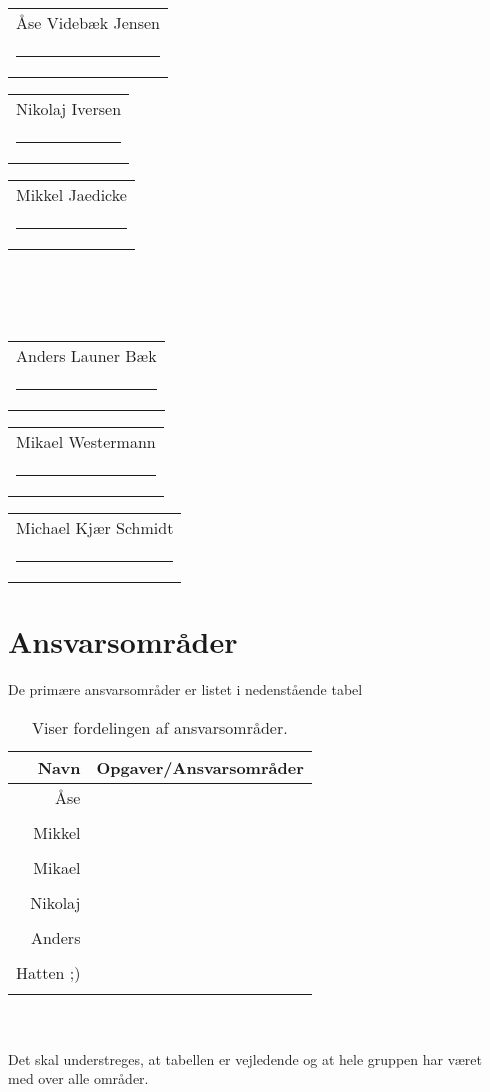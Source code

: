 




\vspace{3cm}
{
\newcommand{\namesigdate}[2][5cm]{%
  \begin{tabular}{@{}p{#1}@{}}
    #2 \\[2\normalbaselineskip] \hrule \\[0pt]
  \end{tabular}
}
\begin{changemargin}{-1cm}{-1cm}
\centering
\noindent \namesigdate{Åse Videbæk Jensen} \hspace{1cm} \namesigdate{Nikolaj Iversen} \hspace{1cm} \namesigdate{Mikkel Jaedicke} \\~\\~\\
\centering
\noindent \namesigdate{Anders Launer Bæk} \hspace{1cm}  \namesigdate{Mikael Westermann} \hspace{1cm}   \namesigdate{Michael Kjær Schmidt}
\end{changemargin}
}
\bigskip
\section*{Ansvarsområder}
De primære ansvarsområder er listet i nedenstående tabel
\bigskip
\begin{table}[!th]
\centering
\setlength{\extrarowheight}{5pt}
 \begin{tabular}{r|l}
Navn&Opgaver/Ansvarsområder \\[6pt] \hline
Åse&\\
&\\[6pt] \hline
Mikkel&\\ 
&\\[6pt] \hline
Mikael&\\
&\\[6pt] \hline
Nikolaj&\\
&\\[6pt] \hline
Anders&\\
&\\[6pt] \hline
Hatten ;) &\\
&\\
\end{tabular}     
\caption*{Viser fordelingen af ansvarsområder.}            
\end{table}\\~\\ 
Det skal understreges, at tabellen er vejledende og at hele gruppen har været med over alle områder.
